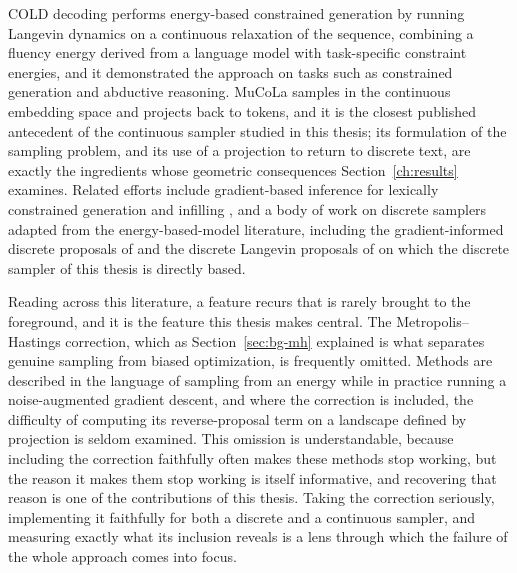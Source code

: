 COLD decoding \citep{qin2022cold} performs energy-based constrained generation by running Langevin dynamics on a continuous relaxation of the sequence, combining a fluency energy derived from a language model with task-specific constraint energies, and it demonstrated the approach on tasks such as constrained generation and abductive reasoning. MuCoLa \citep{kumar2022gradient} samples in the continuous embedding space and projects back to tokens, and it is the closest published antecedent of the continuous sampler studied in this thesis; its formulation of the sampling problem, and its use of a projection to return to discrete text, are exactly the ingredients whose geometric consequences Section~\ref{ch:results} examines. Related efforts include gradient-based inference for lexically constrained generation and infilling \citep{sha2020gradient}, and a body of work on discrete samplers adapted from the energy-based-model literature, including the gradient-informed discrete proposals of \citet{grathwohl2021oops} and the discrete Langevin proposals of \citet{zhang2022langevin} on which the discrete sampler of this thesis is directly based.

Reading across this literature, a feature recurs that is rarely brought to the foreground, and it is the feature this thesis makes central. The Metropolis--Hastings correction, which as Section~\ref{sec:bg-mh} explained is what separates genuine sampling from biased optimization, is frequently omitted. Methods are described in the language of sampling from an energy while in practice running a noise-augmented gradient descent, and where the correction is included, the difficulty of computing its reverse-proposal term on a landscape defined by projection is seldom examined. This omission is understandable, because including the correction faithfully often makes these methods stop working, but the reason it makes them stop working is itself informative, and recovering that reason is one of the contributions of this thesis. Taking the correction seriously, implementing it faithfully for both a discrete and a continuous sampler, and measuring exactly what its inclusion reveals is a lens through which the failure of the whole approach comes into focus.

